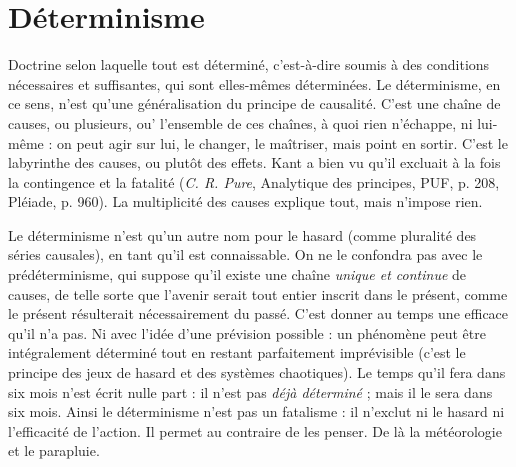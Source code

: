 
\section{Déterminisme}
Doctrine selon laquelle tout est déterminé, c’est-à-dire
soumis à des conditions nécessaires et suffisantes, qui
sont elles-mêmes déterminées. Le déterminisme, en ce sens, n’est qu’une généralisation
du principe de causalité. C’est une chaîne de causes, ou plusieurs, ou’
l’ensemble de ces chaînes, à quoi rien n’échappe, ni lui-même : on peut agir sur
lui, le changer, le maîtriser, mais point en sortir. C’est le labyrinthe des causes,
ou plutôt des effets. Kant a bien vu qu’il excluait à la fois la contingence et la
fatalité ({\it C. R. Pure}, Analytique des principes, PUF, p. 208, Pléiade, p. 960). La
multiplicité des causes explique tout, mais n’impose rien.

Le déterminisme n’est qu’un autre nom pour le hasard (comme pluralité
des séries causales), en tant qu’il est connaissable. On ne le confondra pas avec
le prédéterminisme, qui suppose qu’il existe une chaîne {\it unique et continue} de
causes, de telle sorte que l’avenir serait tout entier inscrit dans le présent,
comme le présent résulterait nécessairement du passé. C’est donner au temps
une efficace qu’il n’a pas. Ni avec l’idée d’une prévision possible : un phénomène
peut être intégralement déterminé tout en restant parfaitement imprévisible
(c’est le principe des jeux de hasard et des systèmes chaotiques). Le temps
qu'il fera dans six mois n’est écrit nulle part : il n’est pas {\it déjà déterminé} ; mais
il le sera dans six mois. Ainsi le déterminisme n’est pas un fatalisme : il n’exclut
ni le hasard ni l'efficacité de l’action. Il permet au contraire de les penser. De là
la météorologie et le parapluie.

